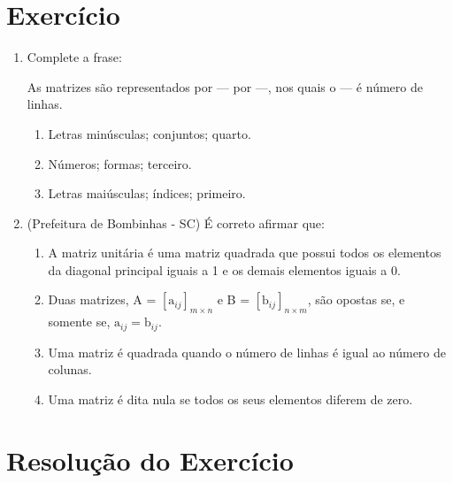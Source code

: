 \documentclass[a4paper,12pt]{article}
\begin{document}
\newpage

\section{Exercício}

 \begin{enumerate}
 
\item Complete a frase:

As matrizes são representados por --- por ---, nos quais o --- é número de linhas.

    \begin{enumerate}
    
        \item Letras minúsculas; conjuntos; quarto.
        
        \item Números; formas; terceiro.
        
        \item Letras maiúsculas; índices; primeiro.
        
    \end{enumerate}


\item (Prefeitura de Bombinhas - SC) É correto afirmar que:

    \begin{enumerate}

    \item A matriz unitária é uma matriz quadrada que possui todos os elementos da diagonal principal iguais a 1 e os demais elementos iguais a 0.
    
    \item Duas matrizes, A = $ [\text{a}_{ij}]_{m \times n} $ e B = $ [\text{b}_{ij}]_{n \times m} $, são opostas se, e somente se, $ \text{a}_{ij} = \text{b}_{ij}$.
    
    \item Uma matriz é quadrada quando o número de linhas é igual ao número de colunas.
    
    \item Uma matriz é dita nula se todos os seus elementos diferem de zero.

    \end{enumerate}

 \end{enumerate}
 
\section{Resolução do Exercício}
 
\end{document}
